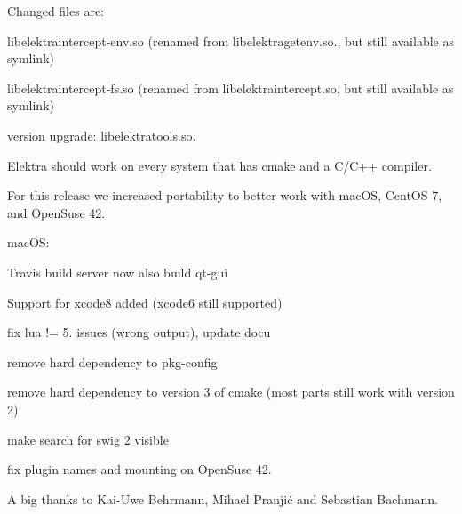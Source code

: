 Changed files are\+:


\begin{DoxyItemize}
\item {\ttfamily libelektraintercept-\/env.\+so} (renamed from {\ttfamily libelektragetenv.\+so.}, but still available as symlink)
\item {\ttfamily libelektraintercept-\/fs.\+so} (renamed from {\ttfamily libelektraintercept.\+so}, but still available as symlink)
\item version upgrade\+: {\ttfamily libelektratools.\+so.}
\end{DoxyItemize}

Elektra should work on every system that has {\ttfamily cmake} and a {\ttfamily C/\+C++} compiler.

For this release we increased portability to better work with mac\+OS, Cent\+OS 7, and Open\+Suse 42.


\begin{DoxyItemize}
\item mac\+OS\+:
\begin{DoxyItemize}
\item Travis build server now also build qt-\/gui
\item Support for xcode8 added (xcode6 still supported)
\end{DoxyItemize}
\item fix lua != 5. issues (wrong output), update docu
\item remove hard dependency to {\ttfamily pkg-\/config}
\item remove hard dependency to version 3 of {\ttfamily cmake} (most parts still work with version 2)
\item make search for swig 2 visible
\item fix plugin names and mounting on Open\+Suse 42.
\end{DoxyItemize}

A big thanks to Kai-\/\+Uwe Behrmann, Mihael Pranjić and Sebastian Bachmann.



